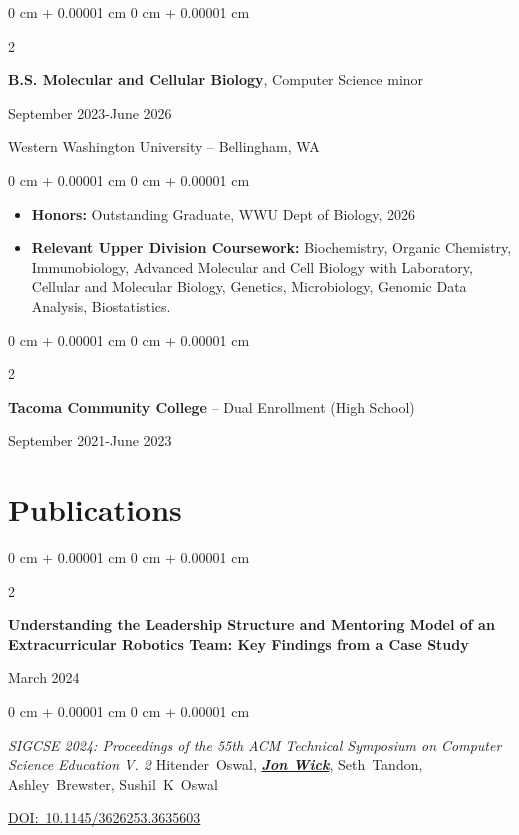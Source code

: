 \documentclass[10pt, article]{article}
\newenvironment{highlights}{
    \begin{itemize}[
        topsep=0.10 cm,
        parsep=0.10 cm,
        partopsep=0pt,
        itemsep=0pt,
        leftmargin=0 cm + 10pt
    ]
}{
    \end{itemize}
} %
\newenvironment{onecolentry}{
    \begin{adjustwidth}{
        0 cm + 0.00001 cm
    }{
        0 cm + 0.00001 cm
    }
}{
    \end{adjustwidth}
} %
\newenvironment{twocolentry}[2][]{
    \onecolentry
    \def\secondColumn{#2}
    \setcolumnwidth{\fill, 4.5 cm}
    \begin{paracol}{2}
}{
    \switchcolumn \raggedleft \secondColumn
    \end{paracol}
    \endonecolentry
} %
\let\hrefWithoutArrow\href
\begin{document}
\begin{twocolentry}{
		September 2023-June 2026}
	\textbf{B.S. Molecular and Cellular Biology}, Computer Science minor
\end{twocolentry}
Western Washington University -- Bellingham, WA


\begin{onecolentry}
	\begin{highlights}
		\item \textbf{Honors:} Outstanding Graduate, WWU Dept of Biology, 2026
		\item \textbf{Relevant Upper Division Coursework:} Biochemistry, Organic Chemistry, Immunobiology, Advanced Molecular and Cell Biology with Laboratory, Cellular and Molecular Biology, Genetics, Microbiology, Genomic Data Analysis, Biostatistics.

	\end{highlights}
\end{onecolentry}
\begin{twocolentry}{
		September 2021-June 2023
	}
	\textbf{Tacoma Community College} -- Dual Enrollment (High School)

\end{twocolentry}




\section{Publications}


\begin{twocolentry}{
		March 2024
	}
	\textbf{Understanding the Leadership Structure and Mentoring Model of an Extracurricular Robotics Team: Key Findings from a Case Study}
\end{twocolentry}

\vspace{0.10 cm}

\begin{onecolentry}
	\textit{SIGCSE 2024: Proceedings of the 55th ACM Technical Symposium on Computer Science Education V. 2}
	\mbox{Hitender Oswal}, \underline{\textbf{\textit{Jon Wick}}}, \mbox{Seth Tandon}, \mbox{Ashley Brewster}, \mbox{Sushil K Oswal}

	\vspace{0.10 cm}

	\mbox{\hrefWithoutArrow{https://dl.acm.org/doi/10.1145/3626253.3635603}{DOI: 10.1145/3626253.3635603}}%
\end{onecolentry}
\end{document}
